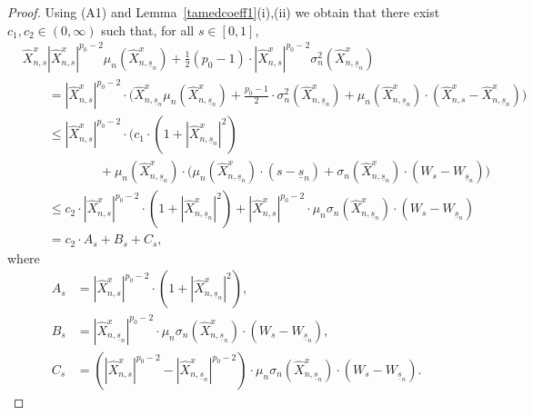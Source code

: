 \documentclass[11pt]{amsart}
\newcommand{\usn}{\underline {s}_n}
\theoremstyle{plain}
\theoremstyle{definition}
\begin{document}
\begin{proof}
Using  (A1) and Lemma~\ref{tamedcoeff1}(i),(ii) we obtain that there exist $c_1,c_2\in (0,\infty)$ such that,  for all $s\in[0,1]$,
\begin{equation}\label{tm3}
\begin{aligned}
& \widehat X^x_{n,s}|\widehat X^x_{n,s}|^{p_0-2}\mu_n(\widehat X^x_{n,\usn}) + \frac{1}{2}  (p_0-1) \cdot|\widehat X^x_{n,s}|^{p_0-2}\sigma_n^2(\widehat X^x_{n,\usn}) \\
& \qquad = |\widehat X^x_{n,s}|^{p_0-2} \cdot\bigl(\widehat X^x_{n,\usn}\mu_n(\widehat X^x_{n,\usn}) + \frac{p_0-1}{2}\cdot \sigma_n^2(\widehat X^x_{n,\usn})+\mu_n(\widehat X^x_{n,\usn})\cdot(\widehat X^x_{n,s}- \widehat X^x_{n,\usn})\bigr)\\
&  \qquad \le  |\widehat X^x_{n,s}|^{p_0-2} \cdot\bigl( c_1\cdot(1+|\widehat X^x_{n,\usn}|^2)\\
& \qquad\qquad\qquad +\mu_n(\widehat X^x_{n,\usn})\cdot(\mu_n(\widehat X^x_{n,\usn})\cdot(s-\usn) + \sigma_n(\widehat X^x_{n,\usn})\cdot(W_s-W_{\usn})\bigr)\\
&  \qquad \le  c_2\cdot|\widehat X^x_{n,s}|^{p_0-2}\cdot (1+|\widehat X^x_{n,\usn}|^2) +  |\widehat X^x_{n,s}|^{p_0-2}
\cdot\mu_n\sigma_n(\widehat X^x_{n,\usn})\cdot(W_s-W_{\usn})\\
&  \qquad =  c_2\cdot A_s +  B_s +  C_s,
\end{aligned}
\end{equation}
where
\begin{equation}\label{tm4}
\begin{aligned}
A_s & = |\widehat X^x_{n,s}|^{p_0-2} \cdot(1+|\widehat X^x_{n,\usn}|^2),\\
B_s & = |\widehat X^x_{n,\usn}|^{p_0-2} \cdot\mu_n\sigma_n(\widehat X^x_{n,\usn})\cdot(W_s-W_{\usn}),\\
C_s & = (|\widehat X^x_{n,s}|^{p_0-2} -|\widehat X^x_{n,\usn}|^{p_0-2}) \cdot\mu_n\sigma_n(\widehat X^x_{n,\usn})\cdot(W_s-W_{\usn}).
\end{aligned}
\end{equation}


\end{proof}
\end{document}
